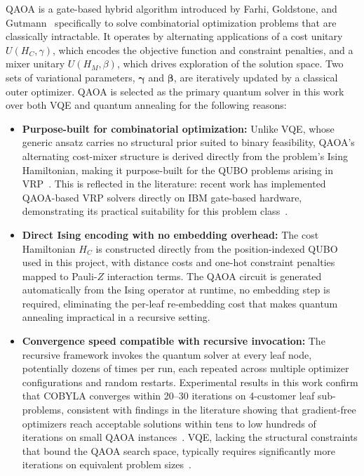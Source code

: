 \documentclass[a4paper]{report}
\begin{document}
{\begin{itemize}
\begin{enumerate}
  QAOA is a gate-based hybrid algorithm introduced by Farhi, Goldstone, and
  Gutmann~\cite{farhi2014qaoa} specifically to solve combinatorial optimization
  problems that are classically intractable. It operates by alternating
  applications of a cost unitary $U(H_C, \gamma)$, which encodes the objective
  function and constraint penalties, and a mixer unitary $U(H_M, \beta)$, which
  drives exploration of the solution space. Two sets of variational parameters,
  $\boldsymbol{\gamma}$ and $\boldsymbol{\beta}$, are iteratively updated by a
  classical outer optimizer.
\newline 
\newline
QAOA is selected as the primary quantum solver in this work over both VQE and
  quantum annealing for the following reasons:
\begin{itemize}
    \item\textbf{{Purpose-built for combinatorial optimization:}}
  Unlike VQE, whose generic ansatz carries no structural prior suited to binary
  feasibility, QAOA's alternating cost-mixer structure is derived directly from
  the problem's Ising Hamiltonian, making it purpose-built for the QUBO problems
  arising in VRP~\cite{blekos2024review, farhi2014qaoa}. This is reflected in
  the literature: recent work has implemented QAOA-based VRP solvers directly on
  IBM gate-based hardware, demonstrating its practical suitability for this
  problem class~\cite{qaoa_vrp_ibm2025, qaoa_vrp_nature2024}.

  \item\textbf{{Direct Ising encoding with no embedding overhead:}}
  The cost Hamiltonian $H_C$ is constructed directly from the position-indexed
  QUBO used in this project, with distance costs and one-hot constraint penalties
  mapped to Pauli-$Z$ interaction terms. The QAOA circuit is generated
  automatically from the Ising operator at runtime, no embedding step is
  required, eliminating the per-leaf re-embedding cost that makes quantum
  annealing impractical in a recursive setting.


  \item\textbf{{Convergence speed compatible with recursive invocation:}}
  The recursive framework invokes the quantum solver at every leaf node,
  potentially dozens of times per run, each repeated across multiple optimizer
  configurations and random restarts. Experimental results in this work confirm
  that COBYLA converges within 20--30 iterations on 4-customer leaf
  sub-problems, consistent with findings in the literature showing that
  gradient-free optimizers reach acceptable solutions within tens to low hundreds
  of iterations on small QAOA instances~\cite{pellow2024qaoa_noise}. VQE,
  lacking the structural constraints that bound the QAOA search space, typically
  requires significantly more iterations on equivalent problem
  sizes~\cite{blekos2024review}.
\end{itemize}


\end{enumerate}
\end{itemize}}
\end{document}
